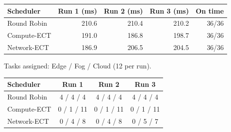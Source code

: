 \begin{table}[H]
\centering
\label{table:example-c:start}
\begin{tabular}{lrrrr}
\toprule
\textbf{Scheduler} & \textbf{Run 1 (ms)} & \textbf{Run 2 (ms)} & \textbf{Run 3 (ms)} & \textbf{On time} \\
\midrule
Round Robin & 210.6 & 210.4 & 210.2 & 36/36 \\
Compute-ECT & 191.0 & 186.8 & 198.7 & 36/36 \\
Network-ECT & 186.9 & 206.5 & 204.5 & 36/36 \\
\bottomrule
\end{tabular}
\par\smallskip
{\small Tasks assigned: Edge / Fog / Cloud (12 per run).}\par\smallskip
\begin{tabular}{lccc}
\toprule
\textbf{Scheduler} & \textbf{Run 1} & \textbf{Run 2} & \textbf{Run 3} \\
\midrule
Round Robin & 4 / 4 / 4 & 4 / 4 / 4 & 4 / 4 / 4 \\
Compute-ECT & 0 / 1 / 11 & 0 / 1 / 11 & 0 / 1 / 11 \\
Network-ECT & 0 / 4 / 8 & 0 / 4 / 8 & 0 / 5 / 7 \\
\bottomrule
\end{tabular}
\label{table:example-c:end}
\end{table}
